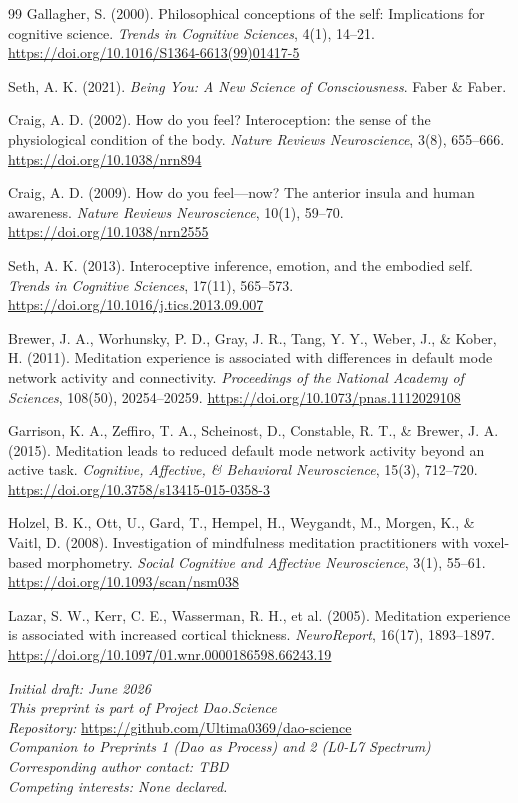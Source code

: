 \documentclass[11pt,a4paper]{article}
\begin{document}
\begin{thebibliography}{99}
Gallagher, S. (2000).
Philosophical conceptions of the self: Implications for cognitive science.
\textit{Trends in Cognitive Sciences}, 4(1), 14--21.
\url{https://doi.org/10.1016/S1364-6613(99)01417-5}

Seth, A. K. (2021).
\textit{Being You: A New Science of Consciousness}.
Faber \& Faber.

Craig, A. D. (2002).
How do you feel? Interoception: the sense of the physiological condition of the body.
\textit{Nature Reviews Neuroscience}, 3(8), 655--666.
\url{https://doi.org/10.1038/nrn894}

Craig, A. D. (2009).
How do you feel---now? The anterior insula and human awareness.
\textit{Nature Reviews Neuroscience}, 10(1), 59--70.
\url{https://doi.org/10.1038/nrn2555}

Seth, A. K. (2013).
Interoceptive inference, emotion, and the embodied self.
\textit{Trends in Cognitive Sciences}, 17(11), 565--573.
\url{https://doi.org/10.1016/j.tics.2013.09.007}

Brewer, J. A., Worhunsky, P. D., Gray, J. R., Tang, Y. Y., Weber, J., \& Kober, H. (2011).
Meditation experience is associated with differences in default mode network activity and connectivity.
\textit{Proceedings of the National Academy of Sciences}, 108(50), 20254--20259.
\url{https://doi.org/10.1073/pnas.1112029108}

Garrison, K. A., Zeffiro, T. A., Scheinost, D., Constable, R. T., \& Brewer, J. A. (2015).
Meditation leads to reduced default mode network activity beyond an active task.
\textit{Cognitive, Affective, \& Behavioral Neuroscience}, 15(3), 712--720.
\url{https://doi.org/10.3758/s13415-015-0358-3}

Holzel, B. K., Ott, U., Gard, T., Hempel, H., Weygandt, M., Morgen, K., \& Vaitl, D. (2008).
Investigation of mindfulness meditation practitioners with voxel-based morphometry.
\textit{Social Cognitive and Affective Neuroscience}, 3(1), 55--61.
\url{https://doi.org/10.1093/scan/nsm038}

Lazar, S. W., Kerr, C. E., Wasserman, R. H., et al. (2005).
Meditation experience is associated with increased cortical thickness.
\textit{NeuroReport}, 16(17), 1893--1897.
\url{https://doi.org/10.1097/01.wnr.0000186598.66243.19}

\end{thebibliography}

\vspace{12pt}
\noindent\textit{Initial draft: June 2026}\\
\textit{This preprint is part of Project Dao.Science}\\
\textit{Repository:} \url{https://github.com/Ultima0369/dao-science}\\
\textit{Companion to Preprints 1 (Dao as Process) and 2 (L0-L7 Spectrum)}\\
\textit{Corresponding author contact: TBD}\\
\textit{Competing interests: None declared.}
\end{document}
